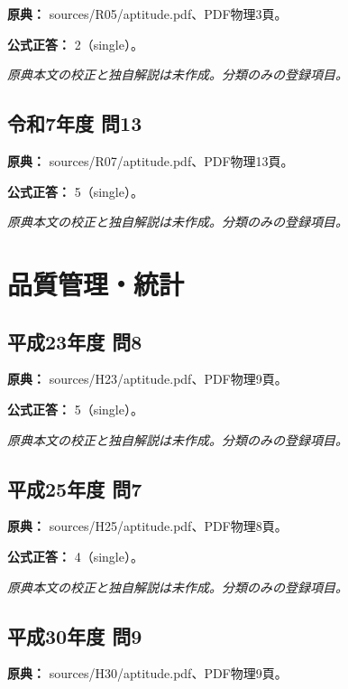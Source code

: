 \noindent\textbf{原典：} sources/R05/aptitude.pdf、PDF物理3頁。

\textbf{公式正答：} 2（single）。

\par\textit{原典本文の校正と独自解説は未作成。分類のみの登録項目。}

\subsection{令和7年度 問13}
\label{q:r07-reg-apt-13}

\noindent\textbf{原典：} sources/R07/aptitude.pdf、PDF物理13頁。

\textbf{公式正答：} 5（single）。

\par\textit{原典本文の校正と独自解説は未作成。分類のみの登録項目。}

\section{品質管理・統計}

\subsection{平成23年度 問8}
\label{q:h23-reg-apt-08}

\noindent\textbf{原典：} sources/H23/aptitude.pdf、PDF物理9頁。

\textbf{公式正答：} 5（single）。

\par\textit{原典本文の校正と独自解説は未作成。分類のみの登録項目。}

\subsection{平成25年度 問7}
\label{q:h25-reg-apt-07}

\noindent\textbf{原典：} sources/H25/aptitude.pdf、PDF物理8頁。

\textbf{公式正答：} 4（single）。

\par\textit{原典本文の校正と独自解説は未作成。分類のみの登録項目。}

\subsection{平成30年度 問9}
\label{q:h30-reg-apt-09}

\noindent\textbf{原典：} sources/H30/aptitude.pdf、PDF物理9頁。

